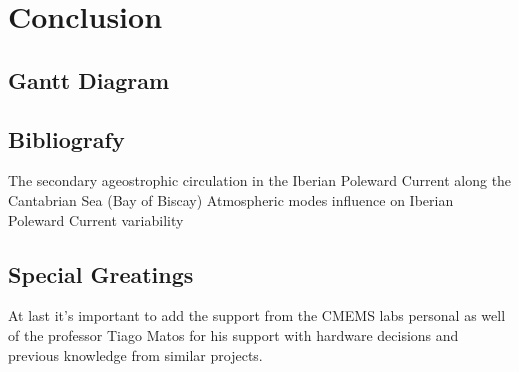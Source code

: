 \chapter{Conclusion}
\section{Gantt Diagram}
\section{Bibliografy}
The secondary ageostrophic circulation in the Iberian Poleward Current along the Cantabrian Sea (Bay of Biscay)
Atmospheric modes influence on Iberian Poleward Current variability
\section{Special Greatings}
At last it's important to add the support from the 
CMEMS labs personal as well of the professor Tiago Matos for his support with hardware
decisions and previous knowledge from similar projects.